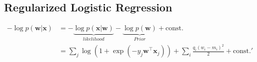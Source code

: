 \begin{appendices}
\section{Regularized Logistic Regression}

\begin{align*}
	-\log p(\boldsymbol{w}|\boldsymbol{x}) &= -\underbrace{\log p(\boldsymbol{x}|\boldsymbol{w})}_{likelihood} - \underbrace{\log p(\boldsymbol{w})}_{Prior} + \text{const.} \\
	&= \sum\limits_j \log \left( 1 + \exp(-y_j \boldsymbol{w}^\top \boldsymbol{x}_j) \right) + \sum\limits_i \frac{q_i (w_i - m_i)^2}{2} + \text{const.}'
\end{align*}

\end{appendices}

